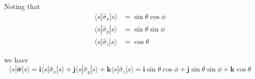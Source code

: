 


\bigskip
Noting that
\begin{align*}
\langle s|\hat\sigma_x|s\rangle&=\sin\theta\cos\phi
\\
\langle s|\hat\sigma_y|s\rangle&=\sin\theta\sin\phi
\\
\langle s|\hat\sigma_z|s\rangle&=\cos\theta
\end{align*}

we have
\begin{equation*}
\langle s|\hat{\boldsymbol\sigma}|s\rangle=
\mathbf i\langle s|\hat\sigma_x|s\rangle+\mathbf j\langle s|\hat\sigma_y|s\rangle
+\mathbf k\langle s|\hat\sigma_z|s\rangle
=\mathbf i\sin\theta\cos\phi+\mathbf j\sin\theta\sin\phi+\mathbf k\cos\theta
\end{equation*}


